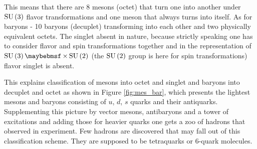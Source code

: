 This means that there are 8 mesons (octet) that turn one into another under
$\mathrm{SU}\left({3}\right)$ flavor transformations and one meson that always turns into
itself. As for baryons - 10 baryons (decuplet) transforming into each other and
two physically equivalent octets.  The singlet absent in nature, because
strictly speaking one has to consider flavor and spin transformations together
and in the representation of $\SUgroup{3} \times \SUgroup{2}$ (the
$\mathrm{SU}\left({2}\right)$ group is here for spin transformations) flavor singlet is absent.

This explains classification of mesons into octet and singlet and baryons into
decuplet and octet as shown in Figure \ref{fig:mes_bar}, which presents the
lightest mesons and baryons consisting of $u$, $d$, $s$ quarks and their
antiquarks. Supplementing this picture by vector mesons, antibaryons and
a tower of excitations and adding those for heavier quarks one gets a zoo of
hadrons that observed in experiment. Few hadrons are discovered that may fall
out of this classification scheme. They are supposed to be tetraquarks
or 6-quark molecules.

